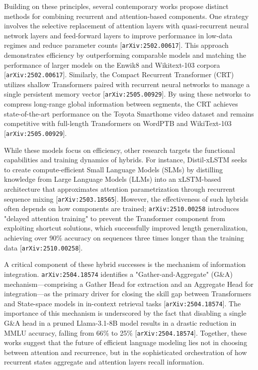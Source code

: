 \documentclass[11pt]{article}
\begin{document}
Building on these principles, several contemporary works propose distinct methods for combining recurrent and attention-based components. One strategy involves the selective replacement of attention layers with quasi-recurrent neural network layers and feed-forward layers to improve performance in low-data regimes and reduce parameter counts [\texttt{arXiv:2502.00617}]. This approach demonstrates efficiency by outperforming comparable models and matching the performance of larger models on the Enwik8 and Wikitext-103 corpora [\texttt{arXiv:2502.00617}]. Similarly, the Compact Recurrent Transformer (CRT) utilizes shallow Transformers paired with recurrent neural networks to manage a single persistent memory vector [\texttt{arXiv:2505.00929}]. By using these networks to compress long-range global information between segments, the CRT achieves state-of-the-art performance on the Toyota Smarthome video dataset and remains competitive with full-length Transformers on WordPTB and WikiText-103 [\texttt{arXiv:2505.00929}].

While these models focus on efficiency, other research targets the functional capabilities and training dynamics of hybrids. For instance, Distil-xLSTM seeks to create compute-efficient Small Language Models (SLMs) by distilling knowledge from Large Language Models (LLMs) into an xLSTM-based architecture that approximates attention parametrization through recurrent sequence mixing [\texttt{arXiv:2503.18565}]. However, the effectiveness of such hybrids often depends on how components are trained; \texttt{arXiv:2510.00258} introduces "delayed attention training" to prevent the Transformer component from exploiting shortcut solutions, which successfully improved length generalization, achieving over 90\% accuracy on sequences three times longer than the training data [\texttt{arXiv:2510.00258}].

A critical component of these hybrid successes is the mechanism of information integration. \texttt{arXiv:2504.18574} identifies a "Gather-and-Aggregate" (G\&A) mechanism—comprising a Gather Head for extraction and an Aggregate Head for integration—as the primary driver for closing the skill gap between Transformers and State-space models in in-context retrieval tasks [\texttt{arXiv:2504.18574}]. The importance of this mechanism is underscored by the fact that disabling a single G\&A head in a pruned Llama-3.1-8B model results in a drastic reduction in MMLU accuracy, falling from 66\% to 25\% [\texttt{arXiv:2504.18574}]. Together, these works suggest that the future of efficient language modeling lies not in choosing between attention and recurrence, but in the sophisticated orchestration of how recurrent states aggregate and attention layers recall information.
\end{document}
